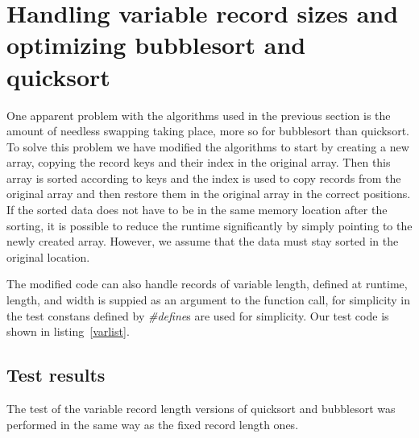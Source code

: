 \section{Handling variable record sizes and optimizing bubblesort and quicksort}
One apparent problem with the algorithms used in the previous section is the amount of needless swapping taking place, more so
for bubblesort than quicksort. To solve this problem we have modified the algorithms to start by creating a new array, copying 
the record keys and their index in the original array. Then this array is sorted according to keys and the index is used to copy 
records from the original array and then restore them in the original array in the correct positions. If the sorted data does not have
to be in the same memory location after the sorting, it is possible to reduce the runtime significantly by simply pointing to the newly
created array. However, we assume that the data must stay sorted in the original location.


The modified code can also handle records of variable length, defined at
runtime, length, and width is suppied as an argument to the function call, 
for simplicity in the test constans defined by \emph{\#define}s are used for
simplicity.
Our test code is shown in listing~\ref{varlist}. 
\subsection{Test results}
The test of the variable record length versions of quicksort and bubblesort was performed in the same way as the fixed record length ones.
